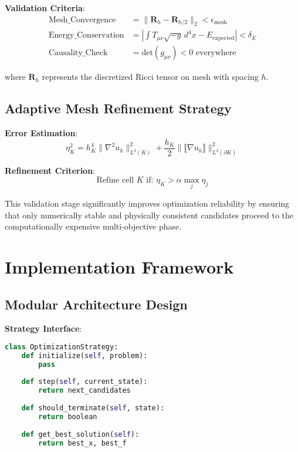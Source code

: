 \documentclass[11pt,a4paper]{article}
\begin{document}
\textbf{Validation Criteria}:
\begin{align}
\text{Mesh\_Convergence} &= \|\mathbf{R}_h - \mathbf{R}_{h/2}\|_2 < \epsilon_{\text{mesh}} \\
\text{Energy\_Conservation} &= \left|\int T_{\mu\nu} \sqrt{-g} \, d^4x - E_{\text{expected}}\right| < \delta_E \\
\text{Causality\_Check} &= \text{det}(g_{\mu\nu}) < 0 \text{ everywhere}
\end{align}

where $\mathbf{R}_h$ represents the discretized Ricci tensor on mesh with spacing $h$.

\subsection{Adaptive Mesh Refinement Strategy}

\textbf{Error Estimation}:
\begin{equation}
\eta_K^2 = h_K^4 \|\nabla^2 u_h\|_{L^2(K)}^2 + \frac{h_K}{2} \|\llbracket \nabla u_h \rrbracket\|_{L^2(\partial K)}^2
\end{equation}

\textbf{Refinement Criterion}:
\begin{equation}
\text{Refine cell } K \text{ if: } \eta_K > \alpha \max_j \eta_j
\end{equation}

This validation stage significantly improves optimization reliability by ensuring that only numerically stable and physically consistent candidates proceed to the computationally expensive multi-objective phase.

\section{Implementation Framework}

\subsection{Modular Architecture Design}

\textbf{Strategy Interface}:
\begin{lstlisting}[language=Python]
class OptimizationStrategy:
    def initialize(self, problem):
        pass
    
    def step(self, current_state):
        return next_candidates
    
    def should_terminate(self, state):
        return boolean
    
    def get_best_solution(self):
        return best_x, best_f
\end{lstlisting}
\end{document}
